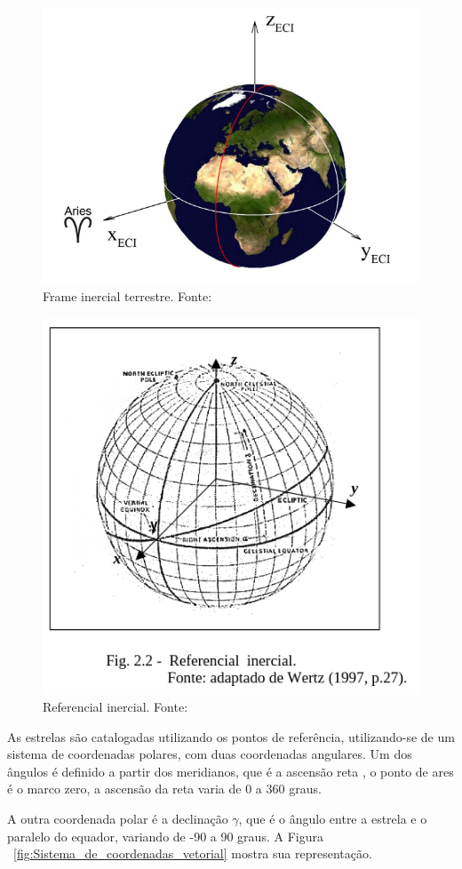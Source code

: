 \begin{figure}[!h]
	\centering
	\includegraphics[width=.7\columnwidth]{images/Frame_inercial_terrestre.png}
	\caption{Frame inercial terrestre. Fonte: ~\cite[]{Diaz}}
	\label{fig:Frame_inercial_terrestre}
\end{figure}

\begin{figure}[!h]
	\centering
	\includegraphics[width=.7\columnwidth]{images/Referencial_inercial.png}
	\caption{Referencial inercial. Fonte: ~\cite[]{Carvalho}}
	\label{fig:Referencial_inercial}
\end{figure}

As estrelas são catalogadas utilizando os pontos de referência, utilizando-se de um sistema de coordenadas polares, com duas coordenadas angulares. Um dos ângulos é definido a partir dos meridianos, que é a ascensão reta , o ponto de ares é o marco zero, a ascensão da reta varia de 0 a 360 graus.

A outra coordenada polar é a declinação $\gamma$, que é o ângulo entre a estrela e o paralelo do equador, variando de -90 a 90 graus. A Figura ~\ref{fig:Sistema_de_coordenadas_vetorial} mostra sua representação.

